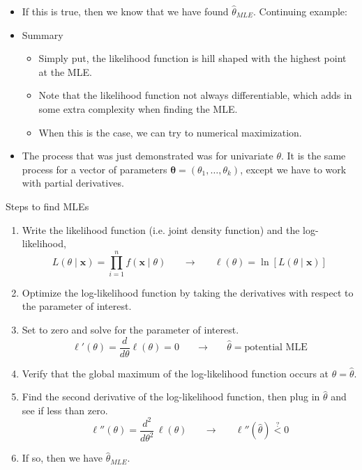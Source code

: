 \documentclass{article}
\newcommand{\vecn}[2]{#1_1, \ldots, #1_{#2}}	%
\begin{document}
\begin{itemize}
    \item[] If this is true, then we know that we have found $\hat{\theta}_{MLE}$. Continuing example:\vspace{60pt}
    \item Summary
    \begin{itemize}
        \item  Simply put, the likelihood function is hill shaped with the highest point at the MLE.
	\item Note that the likelihood function not always differentiable, which adds in some extra complexity when finding the MLE.
	\item[] When this is the case, we can try to numerical maximization.
    \end{itemize}
        \item The process that was just demonstrated was for univariate $\theta$. It is the same process for a vector of parameters $\boldsymbol{\theta} = (\vecn{\theta}{k})$, except we have to work with partial derivatives.
\end{itemize}\bigskip

Steps to find MLEs\bigskip
\begin{enumerate}
    \item Write the likelihood function (i.e. joint density function) and the log-likelihood,
    \[L(\theta \mid \mathbf{x}) = \prod_{i = 1}^n f(\mathbf{x} \mid \theta) \hspace{20pt} \rightarrow \hspace{20pt} \ell(\theta) = \ln[L(\theta \mid \mathbf{x})]\]
    \item Optimize the log-likelihood function by taking the derivatives with respect to the parameter of interest.
    \item[] Set to zero and solve for the parameter of interest.
    \[\ell'(\theta) = \frac{d}{d \theta} \ell(\theta) = 0 \hspace{20pt} \rightarrow \hspace{20pt} \hat{\theta} = \text{potential MLE}\]
    \item Verify that the global maximum of the log-likelihood function occurs at $\theta = \hat{\theta}$.
    \item[] Find the second derivative of the log-likelihood function, then plug in $\hat{\theta}$ and see if less than zero.
    \[\ell''(\theta) = \frac{d^2}{d \theta^2} \, \ell(\theta) \hspace{20pt} \rightarrow \hspace{20pt} \ell''(\hat{\theta}) \overset{?}< 0\]
    \item[] If so, then we have $\hat{\theta}_{MLE}$.
\end{enumerate}\bigskip
\end{document}
